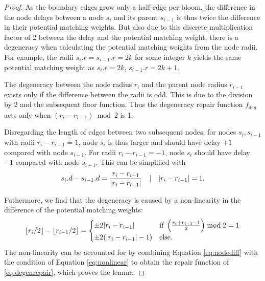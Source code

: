 \begin{proof}
  As the boundary edges grow only a half-edge per bloom, the difference in the node delays between a node $s_i$ and its parent $s_{i-1}$ is thus twice the difference in their potential matching weights. But also due to this discrete multiplication factor of 2 between the delay and the potential matching weight, there is a degeneracy when calculating the potential matching weights from the node radii. For example, the radii $s_i.r = s_{i-1}.r = 2k$ for some integer $k$ yields the same potential matching weight as $s_i.r = 2k$, $s_{i-1}.r = 2k + 1$.

  The degeneracy between the node radius $r_i$ and the parent node radius $r_{i-1}$ exists only if the difference between the radii is odd. This is due to the division by 2 and the subsequent floor function. Thus the degeneracy repair function $f_{deg}$ acts only when $(r_i - r_{i-1}) \bmod 2$ is 1. 
  
  Disregarding the length of edges between two subsequent nodes, for nodes $s_i, s_{i-1}$ with radii $r_i-r_{i-1}=1$, node $s_i$ is thus larger and should have delay $+1$ compared with node $s_{i-1}$. For radii $r_i-r_{i-1}=-1$, node $s_i$ should have delay $-1$ compared with node $s_{i-1}$. This can be simplified with
  \begin{equation}\label{eq:nodediff}
    s_i.d - s_{i-1}.d = \frac{r_i - r_{i-1}}{\abs{r_i - r_{i-1}}} \hspace{1em} | \hspace{1em} \abs{r_i - r_{i-1}} = 1.
  \end{equation}
  
  Futhermore, we find that the degeneracy is caused by a non-linearity in the difference of the potential matching weights:
  \begin{equation}\label{eq:nonlinear}
    {\left \lfloor r_i/2 \right \rfloor }-{\left \lfloor r_{i-1}/2 \right \rfloor } = 
    \begin{cases}
      \pm 2\abs{r_i - r_{i-1}} & \text{if } \left(\frac{r_i+r_{i-1}-1}{2}\right)\bmod 2 = 1 \\
      \pm 2(\abs{r_i - r_{i-1}} - 1) & \text{else}.
    \end{cases}
  \end{equation}
   The non-linearity can be accounted for by combining Equation \eqref{eq:nodediff} with the condition of Equation \eqref{eq:nonlinear} to obtain the repair function of \eqref{eq:degenrepair}, which proves the lemma. 
\end{proof}

